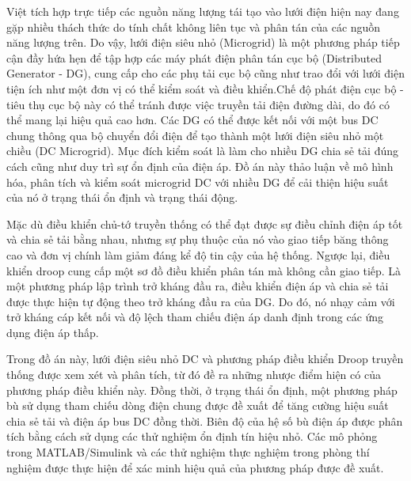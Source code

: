 \newpage
{}

Việt tích hợp trực tiếp các nguồn năng lượng tái tạo vào lưới điện hiện nay đang gặp nhiều thách thức do tính chất không liên tục và phân tán của các nguồn năng lượng trên. Do vậy, lưới điện siêu nhỏ (Microgrid) là một phương pháp tiếp cận đầy hứa hẹn để tập hợp các máy phát điện phân tán cục bộ (Distributed Generator - DG), cung cấp cho các phụ tải cục bộ cũng như trao đổi với lưới điện tiện ích như một đơn vị có thể kiểm soát và điều khiển.Chế độ phát điện cục bộ - tiêu thụ cục bộ này có thể tránh được việc truyền tải điện đường dài, do đó có thể mang lại hiệu quả cao hơn. Các DG có thể được kết nối với một bus DC chung thông qua bộ chuyển đổi điện để tạo thành một lưới điện siêu nhỏ một chiều (DC Microgrid). Mục đích kiểm soát là làm cho nhiều DG chia sẻ tải đúng cách cũng như duy trì sự ổn định của điện áp. Đồ án này thảo luận về mô hình hóa, phân tích và kiểm soát microgrid DC với nhiều DG để cải thiện hiệu suất của nó ở trạng thái ổn định và trạng thái động. \par
Mặc dù điều khiển chủ-tớ truyền thống có thể đạt được sự điều chỉnh điện áp tốt và chia sẻ tải bằng nhau, nhưng sự phụ thuộc của nó vào giao tiếp băng thông cao và đơn vị chính làm giảm đáng kể độ tin cậy của hệ thống. Ngược lại, điều khiển droop cung cấp một sơ đồ điều khiển phân tán mà không cần giao tiếp. Là một phương pháp lập trình trở kháng đầu ra, điều khiển điện áp và chia sẻ tải được thực hiện tự động theo trở kháng đầu ra của DG. Do đó, nó nhạy cảm với trở kháng cáp kết nối và độ lệch tham chiếu điện áp danh định trong các ứng dụng điện áp thấp. \par
Trong đồ án này, lưới điện siêu nhỏ DC và phương pháp điều khiển Droop truyền thống được xem xét và phân tích, từ đó đề ra những nhược điểm hiện có của phương pháp điều khiển này. Đồng thời, ở trạng thái ổn định, một phương pháp bù sử dụng tham chiếu dòng điện chung được đề xuất để tăng cường hiệu suất chia sẻ tải và điện áp bus DC đồng thời. Biên độ của hệ số bù điện áp được phân tích bằng cách sử dụng các thử nghiệm ổn định tín hiệu nhỏ. Các mô phỏng trong MATLAB/Simulink và các thử nghiệm thực nghiệm trong phòng thí nghiệm được thực hiện để xác minh hiệu quả của phương pháp được đề xuất. \par